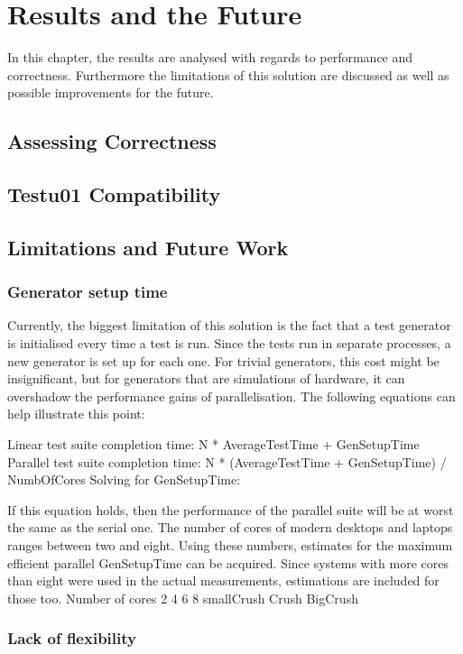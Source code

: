 \chapter{Results and the Future}
\label{cha:results}
In this chapter, the results are analysed with regards to performance and correctness. Furthermore the limitations of this solution are discussed as well as possible improvements for the future.

\section{Assessing Correctness}

\section{Testu01 Compatibility}

\section{Limitations and Future Work}
\subsection{Generator setup time}
Currently, the biggest limitation of this solution is the fact that a test generator is initialised every time a test is run. Since the tests run in separate processes, a new generator is set up for each one.
For trivial generators, this cost might be insignificant, but for generators that are simulations of hardware, it can overshadow the performance gains of parallelisation. The following equations can help illustrate this point:

Linear test suite completion time: N * AverageTestTime + GenSetupTime
Parallel test suite completion time: N * (AverageTestTime + GenSetupTime) / NumbOfCores
Solving for GenSetupTime:

If this equation holds, then the performance of the parallel suite will be at worst the same as the serial one.
The number of cores of modern desktops and laptops ranges between two and eight. Using these numbers, estimates for the maximum efficient parallel GenSetupTime can be acquired. Since systems with more cores than eight were used in the actual measurements, estimations are included for those too.
Number of cores
2 4 6 8
smallCrush
Crush
BigCrush

\subsection{Lack of flexibility}

